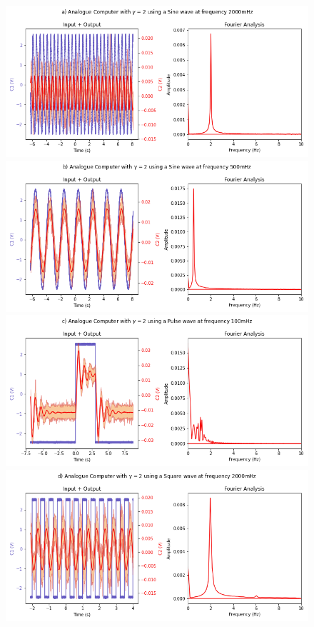 \documentclass[journal]{Imperial_lab_report}
\begin{document}
\begin{appendices}
        
        \begin{figure}
            \label{G 2 Graphs}
            \centering
            \includegraphics[scale = 0.30]{G 2 N_2000.png}
            \includegraphics[scale = 0.30]{G 2 N_500.png}
            \includegraphics[scale = 0.30]{G 2 P_100.png}
            \includegraphics[scale = 0.30]{G 2 S_2000.png}

\end{figure}
\end{appendices}
\end{document}
